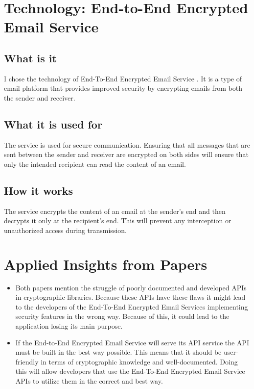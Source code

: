 \documentclass{article}
\begin{document}
\section{Technology: End-to-End Encrypted Email Service}
\subsection{What is it}
I chose the technology of End-To-End Encrypted Email Service \cite{semester}. It is a type of email platform that provides improved security by encrypting emails from both the sender and receiver.

\subsection{What it is used for}
The service is used for secure communication. Ensuring that all messages that are sent between the sender and receiver are encrypted on both sides will ensure that only the intended recipient can read the content of an email.

\subsection{How it works}
The service encrypts the content of an email at the sender's end and then decrypts it only at the recipient's end. This will prevent any interception or unauthorized access during transmission.


\section{Applied Insights from Papers}
\begin{itemize}
    \item Both papers mention the struggle of poorly documented and developed APIs in cryptographic libraries. Because these APIs have these flaws it might lead to the developers of the End-To-End Encrypted Email Services implementing security features in the wrong way. Because of this, it could lead to the application losing its main purpose.
    \item If the End-to-End Encrypted Email Service will serve its API service the API must be built in the best way possible. This means that it should be user-friendly in terms of cryptographic knowledge and well-documented. Doing this will allow developers that use the End-To-End Encrypted Email Service APIs to utilize them in the correct and best way.
\end{itemize}


\newpage
\printbibliography
\end{document}

